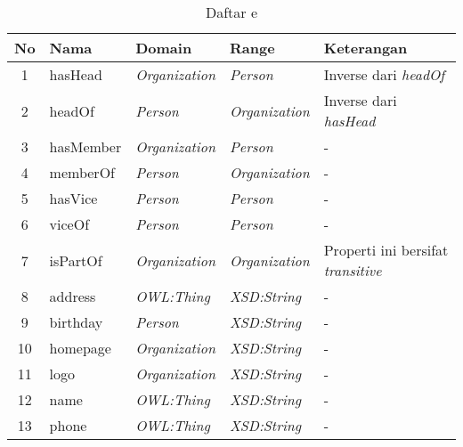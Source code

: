 \begin{table}[tb]
	\caption{Daftar e}
	\label{tab:ontogov_property}
	\centering

	\begin{tabularx}{\textwidth}{|c|l|l|l|X|}
	\hline

	\hline
	\textbf{No} & \textbf{Nama} & \textbf{Domain} & \textbf{Range} & \textbf{Keterangan} \\
	\hline
		1 & hasHead & \emph{Organization} & \emph{Person} & Inverse dari \emph{headOf} \\
	\hline
		2 & headOf & \emph{Person} & \emph{Organization} & Inverse dari \emph{hasHead} \\
	\hline
		3 & hasMember & \emph{Organization} & \emph{Person} & - \\
	\hline
		4 & memberOf & \emph{Person} & \emph{Organization} & - \\
	\hline
		5 & hasVice & \emph{Person} & \emph{Person} & - \\
	\hline
		6 & viceOf & \emph{Person} & \emph{Person} & - \\
	\hline
		7 & isPartOf & \emph{Organization} & \emph{Organization} & Properti ini bersifat \emph{transitive} \\
	\hline
		8 & address & \emph{OWL:Thing} & \emph{XSD:String} & - \\
	\hline
		9 & birthday & \emph{Person} & \emph{XSD:String} & - \\
	\hline
		10 & homepage & \emph{Organization} & \emph{XSD:String} & - \\
	\hline
		11 & logo & \emph{Organization} & \emph{XSD:String} & - \\
	\hline
		12 & name & \emph{OWL:Thing} & \emph{XSD:String} & - \\
	\hline
		13 & phone & \emph{OWL:Thing} & \emph{XSD:String} & - \\
	\hline
	\end{tabularx}
\end{table}